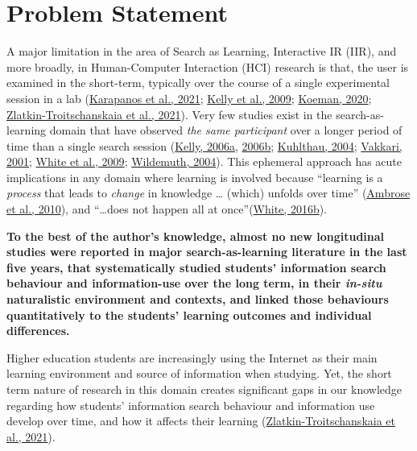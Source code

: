 \documentclass[a4paper, nobind]{templates/ociamthesis}
\begin{document}
\hypertarget{sec_intro_problem_statement}{%
\section{Problem Statement}\label{sec_intro_problem_statement}}

A major limitation in the area of Search as Learning, Interactive IR
(IIR), and more broadly, in Human-Computer Interaction (HCI) research is
that, the user is examined in the short-term, typically over the course
of a single experimental session in a lab
(\protect\hyperlink{ref-karapanos2021advances}{Karapanos et al., 2021}; \protect\hyperlink{ref-kelly2009evaluation}{Kelly et al., 2009}; \protect\hyperlink{ref-HCIUXres81_online}{Koeman, 2020}; \protect\hyperlink{ref-zlatkin2021students}{Zlatkin-Troitschanskaia et al., 2021}).
Very few studies exist in the search-as-learning domain that have
observed \emph{the same participant} over a longer period of time than a
single search session
(\protect\hyperlink{ref-kelly2006measuring_a}{Kelly, 2006a}, \protect\hyperlink{ref-kelly2006measuring_b}{2006b}; \protect\hyperlink{ref-kuhlthau2004seeking}{Kuhlthau, 2004}; \protect\hyperlink{ref-vakkari2001changes}{Vakkari, 2001}; \protect\hyperlink{ref-white2009characterizing}{White et al., 2009}; \protect\hyperlink{ref-wildemuth2004effects}{Wildemuth, 2004}).
This ephemeral approach has acute implications in any domain where
learning is involved because ``learning is a \emph{process} that leads to
\emph{change} in knowledge \ldots{} (which) unfolds over time'' (\protect\hyperlink{ref-ambrose2010howa}{Ambrose et al., 2010}),
and ``\ldots does not happen all at once''(\protect\hyperlink{ref-white_2016_iwss_learning}{White, 2016b}).

\textbf{To the best of the author's knowledge, almost no new longitudinal
studies were reported in major search-as-learning literature in the last
five years, that systematically studied students' information search
behaviour and information-use over the long term, in their \emph{in-situ}
naturalistic environment and contexts, and linked those behaviours
quantitatively to the students' learning outcomes and individual
differences.}

Higher education students are increasingly using the
Internet as their main learning environment and source of information
when studying. Yet, the short term nature of research in this domain
creates significant gaps in our knowledge regarding how students'
information search behaviour and information use develop over time, and
how it affects their learning (\protect\hyperlink{ref-zlatkin2021students}{Zlatkin-Troitschanskaia et al., 2021}).
\end{document}
